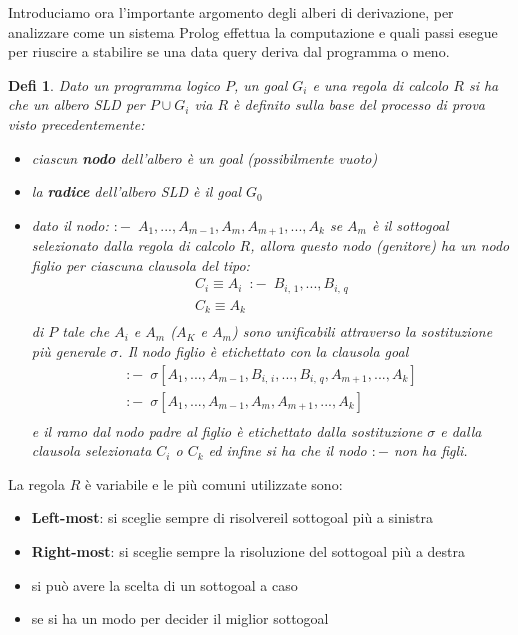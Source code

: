 \documentclass[a4paper]{book}
\newtheorem*{defi}{Defi}%
\begin{document}
Introduciamo ora l'importante argomento degli alberi di derivazione, per analizzare come un sistema Prolog effettua la computazione
e quali passi esegue per riuscire a stabilire se una data query deriva dal programma o meno.
\begin{defi}
Dato un programma logico $P$, un goal $G_i$ e una regola di calcolo $R$ si ha che un \textit{albero SLD} per $P\cup G_i$ via $R$
è definito sulla base del processo di prova visto precedentemente:
\begin{itemize}
\item ciascun \textbf{nodo} dell'albero è un goal (possibilmente vuoto)
\item la \textbf{radice }dell'albero SLD è il goal $G_0$
\item dato il nodo: $:-\,\,\, A_1,...,A_{m-1},A_m,A_{m+1},...,A_k$
  se $A_m$ è il sottogoal selezionato dalla regola di calcolo $R$, allora questo nodo (genitore) ha un nodo figlio
  per ciascuna clausola del tipo:
  \begin{equation*}
    \begin{split}
      C_i\equiv A_i\,\,\, :-\,\,\, B_{i,\,1},...,B_{i,\,q}\\
      C_k \equiv A_k \\
    \end{split}
  \end{equation*}
di $P$ tale che $A_i$ e $A_m$ ($A_K$ e $A_m$) sono unificabili attraverso la sostituzione più generale $\sigma$.\newline
Il nodo figlio è etichettato con la clausola goal
\begin{equation*}
\begin{split}
      :-\,\,\,\sigma[A_1,...,A_{m-1},B_{i,\,i},...,B_{i,\,q},A_{m+1},...,A_k]\\
      :-\,\,\,\sigma[A_1,...,A_{m-1},A_m,A_{m+1},...,A_k]\\
\end{split}
\end{equation*}
e il ramo dal nodo padre al figlio è etichettato dalla sostituzione $\sigma$ e dalla clausola selezionata $C_i$ o $C_k$
ed infine si ha che il nodo $:-$ non ha figli.
\end{itemize}
\end{defi}
La regola $R$ è variabile e le più comuni utilizzate sono:
\begin{itemize}
\item \textbf{Left-most}: si sceglie sempre di risolvereil sottogoal più a sinistra
\item \textbf{Right-most}: si sceglie sempre la risoluzione del sottogoal più a destra
\item si può avere la scelta di un sottogoal a caso
\item se si ha un modo per decider il miglior sottogoal
\end{itemize}
\end{document}
